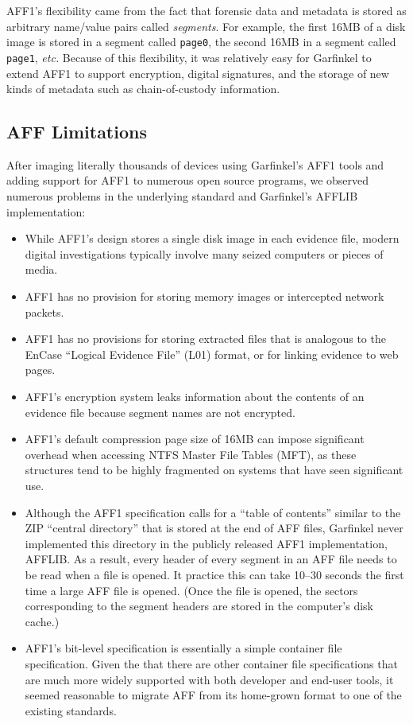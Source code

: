 \documentclass[10pt, conference]{IEEEtran}
\begin{document}
AFF1's flexibility came from the fact that forensic data and metadata
is stored as arbitrary name/value pairs called \emph{segments}. For
example, the first 16MB of a disk image is stored in a segment called
\texttt{page0}, the second 16MB in a segment called \texttt{page1},
\emph{etc.} Because of this flexibility, it was relatively easy for
Garfinkel to extend AFF1 to support encryption, digital signatures, and
the storage of new kinds of metadata such as chain-of-custody
information\cite{garfinkel:affcrypto}. 

\subsection{AFF Limitations}
After imaging literally thousands of devices using Garfinkel's AFF1
tools and adding support for AFF1 to numerous open source programs, we
observed numerous problems in the underlying standard
and Garfinkel's AFFLIB implementation:

\begin{itemize}
\item While AFF1's design stores a single disk image in each evidence
  file, modern digital investigations typically involve many seized
  computers or pieces of media. 
\item AFF1 has no provision for storing memory images or intercepted
  network packets.
\item AFF1 has no provisions for storing extracted files that is
  analogous to the EnCase ``Logical Evidence File'' (L01) format, or
  for linking evidence to web pages.
\item AFF1's encryption system leaks information about the contents of
  an evidence file because segment names are not encrypted.
\item AFF1's default compression page size of 16MB can impose significant overhead
  when accessing NTFS Master File Tables (MFT), as these structures
  tend to be highly fragmented on systems that have seen significant
  use. 
\item Although the AFF1 specification calls for a ``table of contents'' similar
  to the ZIP\cite{zip-format} ``central directory'' that is stored at the end of AFF
  files, Garfinkel never implemented this directory in the publicly
  released AFF1 implementation, AFFLIB. As a result, every header of every segment in an
  AFF file needs to be read when a file is opened. It practice this
  can take 10--30 seconds the first time a large AFF file is
  opened. (Once the file is opened, the sectors corresponding to the
  segment headers are stored in the computer's disk cache.)
\item AFF1's bit-level specification is essentially a simple container
  file specification. Given the that there are other container file
  specifications that are much more widely supported with both
  developer and end-user tools, it seemed reasonable to migrate AFF
  from its home-grown format to one of the existing standards. 
\end{itemize}
\end{document}
